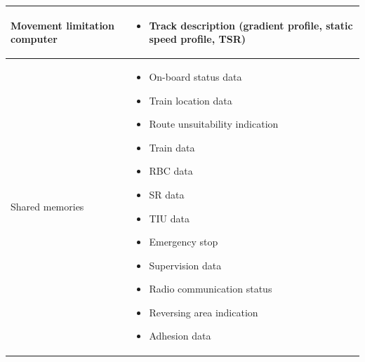 \documentclass[nocc]{template/openetcs_report}
\begin{document}
\begin{longtable}{|l|l|}
				\hline
										
					\begin{minipage}[t]{0.35\linewidth} Movement limitation computer\end{minipage} 
				&	\begin{minipage}[t]{0.65\linewidth}
						\begin{itemize}
							\item Track description (gradient profile, static speed profile, TSR)
						\end{itemize}			
					\end{minipage} \\
				
				\hline											
				
					\begin{minipage}[t]{0.35\linewidth} Shared memories	\end{minipage} 
				&	\begin{minipage}[t]{0.65\linewidth}
						\begin{itemize}
							\item On-board status data
							\item Train location data
							\item Route unsuitability indication
							\item Train data
							\item RBC data
							\item SR data
							\item TIU data
							\item Emergency stop
							\item Supervision data
							\item Radio communication status
							\item Reversing area indication
							\item Adhesion data
						\end{itemize}				
					\end{minipage} \\
				
				\hline	
			\end{longtable}	
\end{document}
